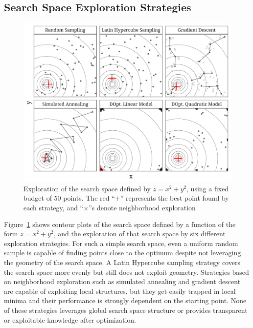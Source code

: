 \documentclass[conference]{IEEEtran}
\begin{document}
\subsection{Search Space Exploration Strategies}
\label{sec:org2f10c51}

\vspace{-15pt}

\begin{center}
\begin{figure}[htbp]
\centering
\includegraphics[width=.95\columnwidth]{./img/sampling_comparison.pdf}
\caption{\label{fig:orgd6b52b2}
Exploration of the search space defined by \(z = x^2 + y^2\), using a fixed budget of 50 points. The red ``\(+\)'' represents the best point found by each strategy, and ``\(\times\)''s denote neighborhood exploration}
\end{figure}
\end{center}

\vspace{-23pt}

Figure~\ref{fig:orgd6b52b2} shows contour plots of the search space
defined by a function of the form \(z = x^2 + y^2\), and the exploration of that
search space by six different exploration strategies. For such a simple search
space, even a uniform random sample is capable of finding points close to the
optimum despite not leveraging the geometry of the search space. A Latin
Hypercube sampling strategy covers the search space more evenly but still does
not exploit geometry. Strategies based on neighborhood exploration such as
simulated annealing and gradient descent are capable of exploiting local
structures, but they get easily trapped in local minima and their performance is
strongly dependent on the starting point. None of these strategies leverages
global search space structure or provides transparent or exploitable knowledge
after optimization.
\end{document}
